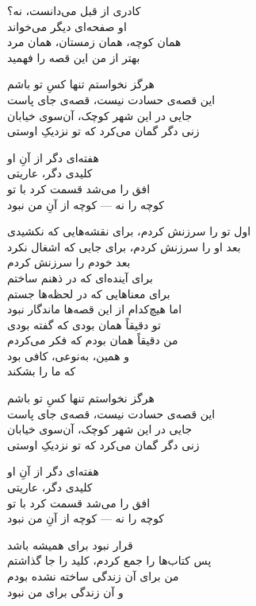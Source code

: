 \begin{lyrics}[12em]
\begin{Arabic}
کادری از قبل می‌دانست، نه؟\\
او صفحه‌ای دیگر می‌خواند\\
همان کوچه، همان زمستان، همان مرد\\
بهتر از من این قصه را فهمید
\end{Arabic}

\begin{Arabic}
هرگز نخواستم تنها کسِ تو باشم\\
این قصه‌ی حسادت نیست، قصه‌ی جای پاست\\
جایی در این شهر کوچک، آن‌سوی خیابان\\
زنی دگر گمان می‌کرد که تو نزدیکِ اوستی

هفته‌ای دگر از آنِ او\\
کلیدی دگر، عاریتی\\
افق را می‌شد قسمت کرد با تو\\
کوچه را نه — کوچه از آنِ من نبود
\end{Arabic}

\begin{Arabic}
اول تو را سرزنش کردم، برای نقشه‌هایی که نکشیدی\\
بعد او را سرزنش کردم، برای جایی که اشغال نکرد\\
بعد خودم را سرزنش کردم\\
برای آینده‌ای که در ذهنم ساختم\\
برای معناهایی که در لحظه‌ها جستم\\
اما هیچ‌کدام از این قصه‌ها ماندگار نبود\\
تو دقیقاً همان بودی که گفته بودی\\
من دقیقاً همان بودم که فکر می‌کردم\\
و همین، به‌نوعی، کافی بود\\
که ما را بشکند
\end{Arabic}

\begin{Arabic}
هرگز نخواستم تنها کسِ تو باشم\\
این قصه‌ی حسادت نیست، قصه‌ی جای پاست\\
جایی در این شهر کوچک، آن‌سوی خیابان\\
زنی دگر گمان می‌کرد که تو نزدیکِ اوستی

هفته‌ای دگر از آنِ او\\
کلیدی دگر، عاریتی\\
افق را می‌شد قسمت کرد با تو\\
کوچه را نه — کوچه از آنِ من نبود
\end{Arabic}

\begin{Arabic}
قرار نبود برای همیشه باشد\\
پس کتاب‌ها را جمع کردم، کلید را جا گذاشتم\\
من برای آن زندگی ساخته نشده بودم\\
و آن زندگی برای من نبود
\end{Arabic}

\end{lyrics}

